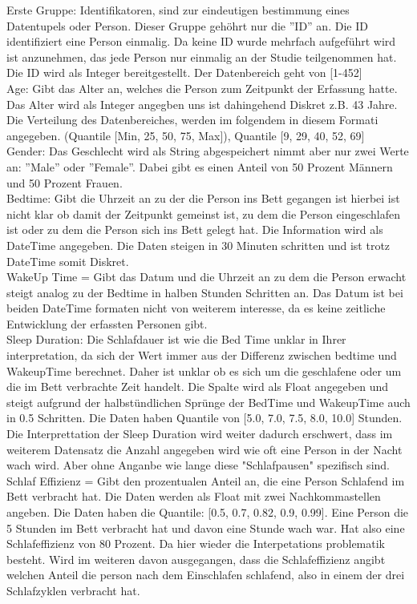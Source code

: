 \documentclass[usegeometry=true]{scrartcl}
\begin{document}
{Erste Gruppe: Identifikatoren, sind zur eindeutigen bestimmung eines Datentupels oder Person. Dieser Gruppe gehöhrt nur die ''ID'' an.
Die ID identifiziert eine Person einmalig. Da keine ID wurde mehrfach aufgeführt wird ist anzunehmen, das jede Person nur einmalig an der Studie teilgenommen hat. Die ID wird als Integer bereitgestellt. Der Datenbereich geht von [1-452]
\\ Age: Gibt das Alter an, welches die Person zum Zeitpunkt der Erfassung hatte. Das Alter wird als Integer angegben uns ist dahingehend Diskret z.B. 43 Jahre. Die Verteilung des Datenbereiches, werden im folgendem in diesem Formati angegeben. (Quantile [Min, 25, 50, 75, Max]), Quantile [9, 29, 40, 52, 69]
\\ Gender: Das Geschlecht wird als String abgespeichert nimmt aber nur zwei Werte an: ''Male'' oder ''Female''. Dabei gibt es einen  Anteil von 50 Prozent Männern und 50 Prozent Frauen. 
\\ Bedtime: Gibt die Uhrzeit an zu der die Person ins Bett gegangen ist hierbei ist nicht klar ob damit der Zeitpunkt gemeinst ist, zu dem die Person eingeschlafen ist oder zu dem die Person sich ins Bett gelegt hat.
 Die Information wird als DateTime angegeben. Die Daten steigen in 30 Minuten schritten und ist trotz DateTime somit Diskret. 
\\ WakeUp Time = Gibt das Datum und die Uhrzeit an zu dem die Person erwacht steigt analog zu der Bedtime in halben Stunden Schritten an. Das Datum ist bei beiden DateTime formaten nicht von weiterem interesse, da es keine zeitliche Entwicklung der erfassten Personen gibt. 
\\ Sleep Duration: Die Schlafdauer ist wie die Bed Time unklar in Ihrer interpretation, da sich der Wert immer aus der Differenz zwischen bedtime und WakeupTime berechnet. Daher ist unklar ob es sich um die geschlafene oder um die im Bett verbrachte Zeit handelt. Die Spalte wird als Float angegeben und steigt aufgrund der halbstündlichen Sprünge der BedTime und WakeupTime auch in 0.5 Schritten. Die Daten haben Quantile von [5.0, 7.0, 7.5, 8.0, 10.0] Stunden.
Die Interprettation der Sleep Duration wird weiter dadurch erschwert, dass im weiterem Datensatz die Anzahl angegeben wird wie oft eine Person in der Nacht wach wird. Aber ohne Anganbe wie lange diese "Schlafpausen" spezifisch sind. 
\\ Schlaf Effizienz = Gibt den prozentualen Anteil an, die eine Person Schlafend im Bett verbracht hat. Die Daten werden als Float mit zwei Nachkommastellen angeben. Die Daten haben die Quantile: [0.5, 0.7, 0.82, 0.9, 0.99]. Eine Person die 5 Stunden im Bett verbracht hat und davon eine Stunde wach war. Hat also eine Schlafeffizienz von 80 Prozent. Da hier wieder die Interpetations problematik besteht. Wird im weiteren davon ausgegangen, dass die Schlafeffizienz angibt welchen Anteil die person nach dem Einschlafen schlafend, also in einem der drei Schlafzyklen verbracht hat.
}
\end{document}

